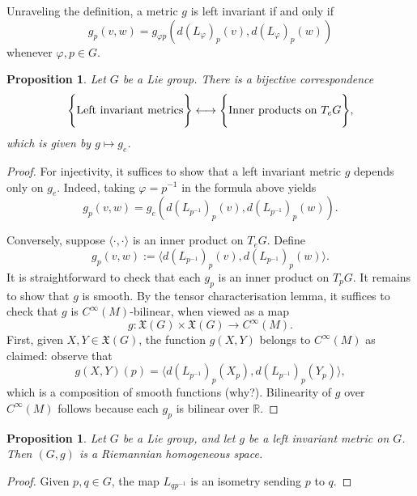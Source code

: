 \documentclass{amsart}[]
\newcommand{\R}{\mathbb R}
\newcommand{\why}{\color{red}(why?)\color{black}}
\theoremstyle{plain}
\newtheorem{proposition}[theorem]{Proposition}
\theoremstyle{definition}
\theoremstyle{remark}
\begin{document}
	Unraveling the definition, a metric $g$ is left invariant if and only if 
	$$g_p (v,w) = g_{\varphi p} \left( d(L_\varphi)_p(v), d(L_\varphi)_p(w)\right)$$
	whenever $\varphi,p \in G$.
	\begin{proposition}
		Let $G$ be a Lie group. There is a bijective correspondence
		$$\Bigg\{ \text{\normalfont Left invariant metrics}\Bigg\} \longleftrightarrow \Bigg\{ \text{\normalfont Inner products on $T_e G$}\Bigg\},$$
		which is given by $g \mapsto g_e$.
	\end{proposition}
	\begin{proof}
		For injectivity, it suffices to show that a left invariant metric $g$ depends only on $g_e$. Indeed, taking $\varphi = p^{-1}$ in the formula above yields
		$$g_p(v,w) = g_e \left( d(L_{p^{-1}})_p(v), d(L_{p^{-1}})_p(w)\right).$$
		
		Conversely, suppose $\langle \cdot , \cdot \rangle$ is an inner product on $T_e G$. Define 
		$$g_p(v,w) := \Big\langle d(L_{p^{-1}})_p(v), d(L_{p^{-1}})_p(w)\Big\rangle.$$
		It is straightforward to check that each $g_p$ is an inner product on $T_p G$. It remains to show that $g$ is smooth. By the tensor characterisation lemma, it suffices to check that $g$ is $C^\infty(M)$-bilinear, when viewed as a map 
		$$g: \mathfrak X(G) \times \mathfrak X(G) \rightarrow C^\infty(M).$$
		First, given $X,Y \in \mathfrak X(G)$, the function $g(X,Y)$ belongs to $C^\infty(M)$ as claimed: observe that 
		$$g(X,Y)(p) = \Big\langle d(L_{p^{-1}})_p(X_p), d(L_{p^{-1}})_p(Y_p)\Big\rangle,$$
		which is a composition of smooth functions \why. Bilinearity of $g$ over $C^\infty(M)$ follows because each $g_p$ is bilinear over $\R$.
	\end{proof}

	

	\begin{proposition}
		Let $G$ be a Lie group, and let $g$ be a left invariant metric on $G$. Then $(G,g)$ is a Riemannian homogeneous space.
	\end{proposition}
	\begin{proof}
		Given $p,q \in G$, the map $L_{qp^{-1}}$ is an isometry sending $p$ to $q$.
	\end{proof}
\end{document}
